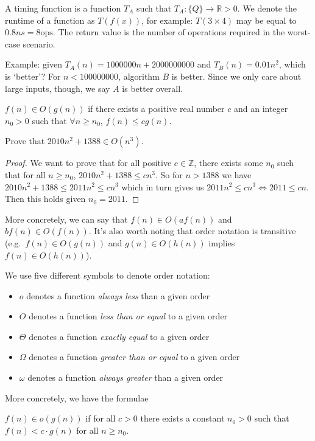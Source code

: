\documentclass[12pt]{article}
\begin{document}
A timing function is a function $T_A$ such that $T_A : \{Q\} \to \mathbb{R} > 0$. We denote the runtime of a function as $T(f(x))$, for example: $T(3 \times 4)$ may be equal to $0.8ns = 8\text{ops}$. The return value is the number of operations required in the worst-case scenario.

Example: given $T_A(n) = 1 000 000n + 2 000 000 000$ and $T_B(n) = 0.01n^2$, which is `better'? For $n < 100 000 000$, algorithm $B$ is better. Since we only care about large inputs, though, we say $A$ is better overall.

\begin{definition}
$f(n) \in O(g(n))$ if there exists a positive real number $c$ and an integer $n_0 > 0$ such that $\forall n \geq n_0$, $f(n) \leq cg(n)$.
\end{definition}

\begin{example}
Prove that $2010n^2 + 1388 \in O(n^3)$.
\begin{proof}
We want to prove that for all positive $c \in \mathbb{Z}$, there exists some $n_0$ such that for all $n \geq n_0$, $2010 n^2 + 1388 \leq cn^3$. So for $n > 1388$ we have $2010n^2 + 1388 \leq 2011n^2 \leq cn^3$ which in turn gives us $2011n^2 \leq cn^3 \iff 2011 \leq cn$. Then this holds given $n_0 = 2011$.
\end{proof}
\end{example}

More concretely, we can say that $f(n) \in O(af(n))$ and $b f(n) \in O(f(n))$. It's also worth noting that order notation is transitive (e.g.\ $f(n) \in O(g(n))$ and $g(n) \in O(h(n))$ implies $f(n) \in O(h(n))$).

We use five different symbols to denote order notation:
\begin{itemize}
\item $o$ denotes a function \emph{always less} than a given order
\item $O$ denotes a function \emph{less than or equal} to a given order
\item $\Theta$ denotes a function \emph{exactly equal} to a given order
\item $\Omega$ denotes a function \emph{greater than or equal} to a given order
\item $\omega$ denotes a function \emph{always greater} than a given order
\end{itemize}

More concretely, we have the formulae
\begin{definition}[$o$]
$f(n) \in o(g(n))$ if for all $c > 0$ there exists a constant $n_0 > 0$ such that $f(n) < c \cdot g(n)$ for all $n \geq n_0$.
\end{definition}
\end{document}
